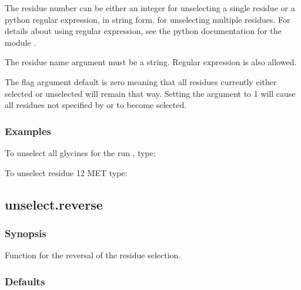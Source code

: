 The residue number can be either an integer for unselecting a single residue or a python
regular expression, in string form, for unselecting multiple residues.  For details about
using regular expression, see the python documentation for the module 
.

The residue name argument must be a string.  Regular expression is also allowed.

The 
 flag argument default is zero meaning that all residues currently either
selected or unselected will remain that way.  Setting the argument to 1 will cause all
residues not specified by 
 or 
 to become selected.


\subsubsection{Examples}

To unselect all glycines for the run 
, type:




To unselect residue 12 MET type:








\newpage

\subsection{unselect.reverse}


\subsubsection{Synopsis}

Function for the reversal of the residue selection.

\subsubsection{Defaults}

